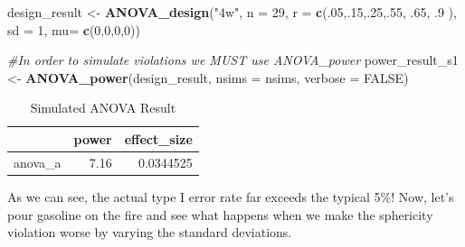 \documentclass[
]{book}
\newenvironment{Shaded}{\begin{snugshade}}{\end{snugshade}}
\newcommand{\CommentTok}[1]{\textcolor[rgb]{0.56,0.35,0.01}{\textit{#1}}}
\newcommand{\DataTypeTok}[1]{\textcolor[rgb]{0.13,0.29,0.53}{#1}}
\newcommand{\DecValTok}[1]{\textcolor[rgb]{0.00,0.00,0.81}{#1}}
\newcommand{\FloatTok}[1]{\textcolor[rgb]{0.00,0.00,0.81}{#1}}
\newcommand{\KeywordTok}[1]{\textcolor[rgb]{0.13,0.29,0.53}{\textbf{#1}}}
\newcommand{\NormalTok}[1]{#1}
\newcommand{\OtherTok}[1]{\textcolor[rgb]{0.56,0.35,0.01}{#1}}
\newcommand{\StringTok}[1]{\textcolor[rgb]{0.31,0.60,0.02}{#1}}
\begin{document}
\begin{Shaded}
\begin{Highlighting}[]
\NormalTok{design_result <-}\StringTok{ }\KeywordTok{ANOVA_design}\NormalTok{(}\StringTok{"4w"}\NormalTok{,}
                              \DataTypeTok{n =} \DecValTok{29}\NormalTok{,}
                              \DataTypeTok{r =} \KeywordTok{c}\NormalTok{(.}\DecValTok{05}\NormalTok{,.}\DecValTok{15}\NormalTok{,.}\DecValTok{25}\NormalTok{,.}\DecValTok{55}\NormalTok{, }\FloatTok{.65}\NormalTok{, }\FloatTok{.9}
\NormalTok{                                    ),}
                              \DataTypeTok{sd =} \DecValTok{1}\NormalTok{,}
                              \DataTypeTok{mu=} \KeywordTok{c}\NormalTok{(}\DecValTok{0}\NormalTok{,}\DecValTok{0}\NormalTok{,}\DecValTok{0}\NormalTok{,}\DecValTok{0}\NormalTok{))}

\CommentTok{#In order to simulate violations we MUST use ANOVA_power}
\NormalTok{power_result_s1 <-}\StringTok{ }\KeywordTok{ANOVA_power}\NormalTok{(design_result, }\DataTypeTok{nsims =}\NormalTok{ nsims, }\DataTypeTok{verbose =} \OtherTok{FALSE}\NormalTok{)}
\end{Highlighting}
\end{Shaded}

\begin{table}[!h]

\caption{\label{tab:unnamed-chunk-129}Simulated ANOVA Result}
\centering
\begin{tabular}[t]{l|r|r}
\hline
  & power & effect\_size\\
\hline
anova\_a & 7.16 & 0.0344525\\
\hline
\end{tabular}
\end{table}

As we can see, the actual type I error rate far exceeds the typical 5\%!
\newpage
Now, let's pour gasoline on the fire and see what happens when we make the sphericity violation worse by varying the standard deviations.
\end{document}
